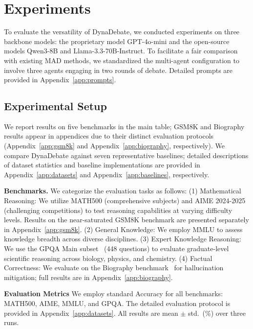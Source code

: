 \section{Experiments}
\label{sec:exp}

To evaluate the versatility of DynaDebate, we conducted experiments on three backbone models: the proprietary model GPT-4o-mini and the open-source models Qwen3-8B and Llama-3.3-70B-Instruct. To facilitate a fair comparison with existing MAD methods, we standardized the multi-agent configuration to involve three agents engaging in two rounds of debate. Detailed prompts are provided in Appendix~\ref{app:prompts}.

\subsection{Experimental Setup}
\label{sec:setup}

We report results on five benchmarks in the main table; GSM8K and Biography results appear in appendices due to their distinct evaluation protocols (Appendix~\ref{app:gsm8k} and Appendix~\ref{app:biography}, respectively). We compare DynaDebate against seven representative baselines; detailed descriptions of dataset statistics and baseline implementations are provided in Appendix~\ref{app:datasets} and Appendix~\ref{app:baselines}, respectively.

\noindent\textbf{Benchmarks.} We categorize the evaluation tasks as follows:
(1) Mathematical Reasoning: We utilize MATH500 (comprehensive subjects) \cite{lightman2023lets} and AIME 2024-2025 (challenging competitions) \cite{aime2024, aime2025} to test reasoning capabilities at varying difficulty levels. Results on the near-saturated GSM8K benchmark \cite{cobbe2021gsm8k} are presented separately in Appendix~\ref{app:gsm8k}.
(2) General Knowledge: We employ MMLU \cite{hendrycks2020measuring} to assess knowledge breadth across diverse disciplines.
(3) Expert Knowledge Reasoning: We use the GPQA Main subset~\cite{rein2023gpqa} (448 questions) to evaluate graduate-level scientific reasoning across biology, physics, and chemistry.
(4) Factual Correctness: We evaluate on the Biography benchmark~\cite{du2023improving} for hallucination mitigation; full results are in Appendix~\ref{app:biography}.

\noindent\textbf{Evaluation Metrics}
We employ standard Accuracy for all benchmarks: MATH500, AIME, MMLU, and GPQA. The detailed evaluation protocol is provided in Appendix~\ref{app:datasets}. All results are mean $\pm$ std.\ (\%) over three runs.

